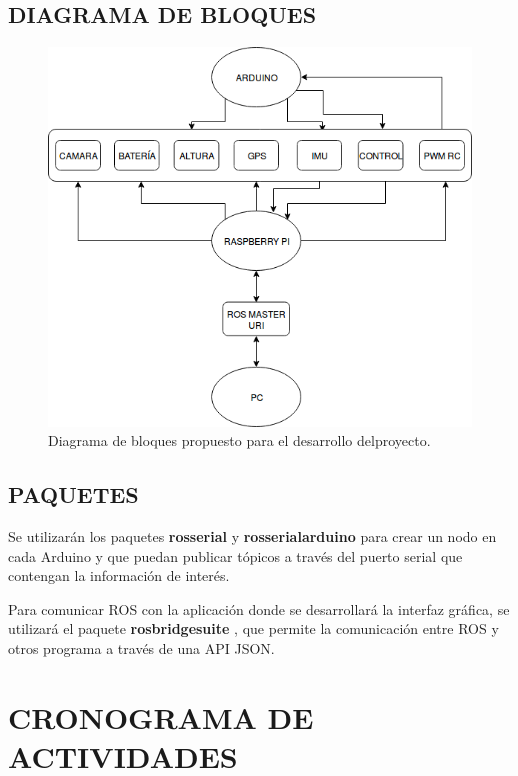 \documentclass[letterpaper, 10 pt, conference]{ieeeconf}  %
\begin{document}
\subsection{DIAGRAMA DE BLOQUES}
\begin{figure}[htpb]
	\centering
	\includegraphics[width=0.99\columnwidth]{diagrama_bloques.png}
	\caption{Diagrama de bloques propuesto para el desarrollo delproyecto.}
	\label{yaw_pitch_roll}
\end{figure}
\subsection{PAQUETES}
\label{paquetes}
Se utilizarán los paquetes \textbf{rosserial} \cite{rosserial} y \textbf{rosserial\textunderscore arduino} \cite{rosserialarduino} para crear un nodo en cada Arduino y que puedan publicar tópicos a través del puerto serial que contengan la información de interés.

Para comunicar ROS con la aplicación donde se desarrollará la interfaz gráfica, se utilizará el paquete \textbf{rosbridge\textunderscore suite} \cite{rosbridge}, que permite la comunicación entre ROS y otros programa a través de una API JSON.

\section{CRONOGRAMA DE ACTIVIDADES}
\end{document}
